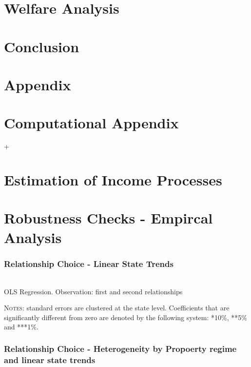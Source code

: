 \documentclass[12pt]{article}
\numberwithin{table}{section}
\begin{document}
\section{Welfare Analysis}
\section{Conclusion}




\appendix

\section*{Appendix}
\section{Computational Appendix}
\cite{arnoud2019}+\cite{cartis2019}
\section{Estimation of Income Processes}
\section{Robustness Checks - Empircal Analysis}
\subsubsection*{Relationship Choice - Linear State Trends}

	\begin{table}[htbp]\centering
	\caption{\\OLS Regression. Observation: first and second relationships}
	\label{table:wmarlin}
	\begin{threeparttable}[t]\centering
	
	\begin{tablenotes}[flushleft]
	\footnotesize{\item \textsc{Notes}: standard errors are clustered at the state level.
		Coefficients that are significantly different from zero are denoted by the following system: *10\%, **5\%  and ***1\%.}
	\end{tablenotes}
	\end{threeparttable}
	\end{table}

\subsubsection*{Relationship Choice - Heterogeneity by Propoerty regime and linear state trends}
\end{document}
